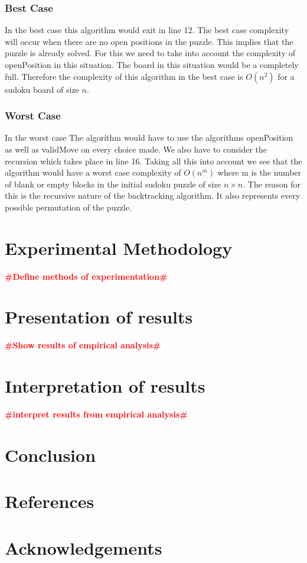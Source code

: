\documentclass[12pt,a4paper,titlepage]{article}
\newcommand{\todo}[1]{\textcolor{red}{\textbf{\##1\#}}}
\begin{document}
\subsubsection{Best Case}

In the best case this algorithm would exit in line 12. The best case complexity will occur when there are no open positions in the puzzle. This implies that the puzzle is already solved. For this we need to take into account the complexity of openPosition in this situation. The board in this situation would be a completely full. Therefore the complexity of this algorithm in the best case is $O(n^{2})$ for a sudoku board of size $n$.


\subsubsection{Worst Case}

In the worst case The algorithm would have to use the algorithms openPosition as well as validMove on every choice made. We also have to consider the recursion which takes place in line 16. Taking all this into account we see that the algorithm would have a worst case complexity of $O(n^{m})$ where m is the number of blank or empty blocks in the initial sudoku puzzle of size $n \times n$. The reason for this is the recursive nature of the backtracking algorithm. It also represents every possible permutation of the puzzle.


\section{Experimental Methodology}

\todo{Define methods of experimentation}

\section{Presentation of results}

\todo{Show results of empirical analysis}

\section{Interpretation of results}

\todo{interpret results from empirical analysis}

\section{Conclusion}

\section{References}

\section{Acknowledgements}
\end{document}
